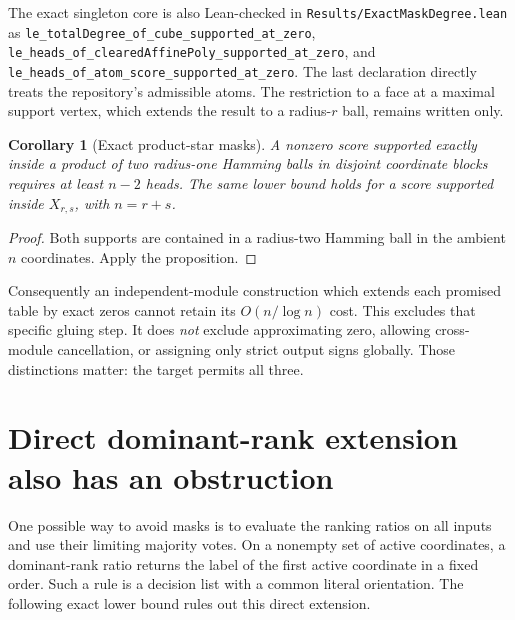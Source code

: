 \documentclass[11pt]{article}
\newtheorem{corollary}[proposition]{Corollary}
\begin{document}
The exact singleton core is also Lean-checked in
\texttt{Results/ExactMaskDegree.lean} as
\texttt{le\_totalDegree\_of\_cube\_supported\_at\_zero},
\texttt{le\_heads\_of\_clearedAffinePoly\_supported\_at\_zero}, and
\texttt{le\_heads\_of\_atom\_score\_supported\_at\_zero}.
The last declaration directly treats the repository's admissible
atoms. The restriction to a face at a maximal support vertex, which
extends the result to a radius-$r$ ball, remains written only.

\begin{corollary}[Exact product-star masks]
A nonzero score supported exactly inside a product of two
radius-one Hamming balls in disjoint coordinate blocks requires
at least $n-2$ heads. The same lower bound holds for a score
supported inside $X_{r,s}$, with $n=r+s$.
\end{corollary}
\begin{proof}
Both supports are contained in a radius-two Hamming ball in the
ambient $n$ coordinates. Apply the proposition.
\end{proof}

Consequently an independent-module construction which extends each
promised table by exact zeros cannot retain its $O(n/\log n)$
cost. This excludes that specific gluing step. It does \emph{not}
exclude approximating zero, allowing cross-module cancellation, or
assigning only strict output signs globally. Those distinctions matter:
the target permits all three.

\section{Direct dominant-rank extension also has an obstruction}

One possible way to avoid masks is to evaluate the ranking ratios on
all inputs and use their limiting majority votes. On a nonempty set
of active coordinates, a dominant-rank ratio returns the label of the
first active coordinate in a fixed order. Such a rule is a decision
list with a common literal orientation. The following exact lower
bound rules out this direct extension.
\end{document}
